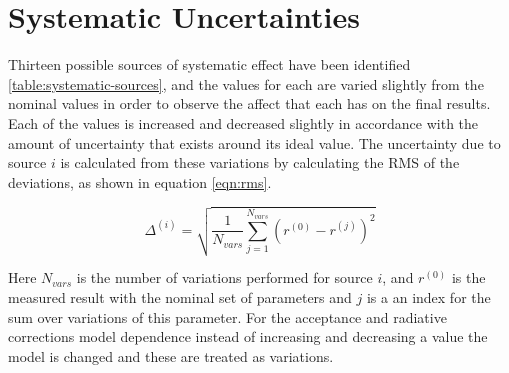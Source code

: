 \section{Systematic Uncertainties}
Thirteen possible sources of systematic effect have been identified \ref{table:systematic-sources}, and the values for each are varied slightly from the nominal values in order to observe the affect that each has on the final results.  Each of the values is increased and decreased slightly in accordance with the amount of uncertainty that exists around its ideal value.  The uncertainty due to source $i$ is calculated from these variations by calculating the RMS of the deviations, as shown in equation \ref{eqn:rms}.

\begin{equation}
	\Delta^{(i)} = \sqrt{\frac{1}{N_{vars}} \sum_{j = 1}^{N_{vars}} (r^{(0)} - r^{(j)})^2}
	\label{eqn:rms}

\end{equation}

Here $N_{vars}$ is the number of variations performed for source $i$, and $r^{(0)}$ is the measured result with the nominal set of parameters and $j$ is a an index for the sum over variations of this parameter.  For the acceptance and radiative corrections model dependence instead of increasing and decreasing a value the model is changed and these are treated as variations.  \\

